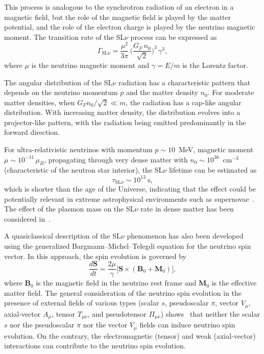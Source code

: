 \documentclass[a4paper,11pt]{article}
\begin{document}
This process is analogous to the synchrotron radiation of an electron in a magnetic field, but the role of the magnetic field is played by the matter potential, and the role of the electron charge is played by the neutrino magnetic moment. The transition rate of the SL$\nu$ process can be expressed as~\cite{Grigoriev:2005PLB}
\begin{equation}
\label{eq:SLnu_rate}
\Gamma_{\text{SL}\nu} = \frac{\mu^2}{3\pi}\,\Big(\frac{G_F\,n_0}{\sqrt{2}}\Big)^3\,\gamma^3,
\end{equation}
where $\mu$ is the neutrino magnetic moment and $\gamma = E/m$ is the Lorentz factor.

The angular distribution of the SL$\nu$ radiation has a characteristic pattern that depends on the neutrino momentum $p$ and the matter density $n_0$. For moderate matter densities, when $G_F n_0 / \sqrt{2} \ll m$, the radiation has a cap-like angular distribution. With increasing matter density, the distribution evolves into a projector-like pattern, with the radiation being emitted predominantly in the forward direction.

For ultra-relativistic neutrinos with momentum $p \sim 10$~MeV, magnetic moment $\mu \sim 10^{-11}\,\mu_B$, propagating through very dense matter with $n_0 \sim 10^{36}$~cm$^{-3}$ (characteristic of the neutron star interior), the SL$\nu$ lifetime can be estimated as
\begin{equation}
\tau_{\text{SL}\nu} \sim 10^{13}~\text{s},
\end{equation}
which is shorter than the age of the Universe, indicating that the effect could be potentially relevant in extreme astrophysical environments such as supernovae~\cite{Grigoriev:2017JCAP}. The effect of the plasmon mass on the SL$\nu$ rate in dense matter has been considered in~\cite{Grigoriev:2012PLB}.

A quasiclassical description of the SL$\nu$ phenomenon has also been developed~\cite{Lobanov:Studenikin:2003PLB} using the generalized Bargmann--Michel--Telegdi equation for the neutrino spin vector. In this approach, the spin evolution is governed by
\begin{equation}
\label{eq:BMT_full}
\frac{d\mathbf{S}}{dt} = \frac{2\mu}{\gamma}\Big[\mathbf{S} \times (\mathbf{B}_0 + \mathbf{M}_0)\Big],
\end{equation}
where $\mathbf{B}_0$ is the magnetic field in the neutrino rest frame and $\mathbf{M}_0$ is the effective matter field. The general consideration of the neutrino spin evolution in the presence of external fields of various types (scalar $s$, pseudoscalar $\pi$, vector $V_\mu$, axial-vector $A_\mu$, tensor $T_{\mu\nu}$, and pseudotensor $\Pi_{\mu\nu}$) shows~\cite{Dvornikov:Studenikin:2002JHEP} that neither the scalar $s$ nor the pseudoscalar $\pi$ nor the vector $V_\mu$ fields can induce neutrino spin evolution. On the contrary, the electromagnetic (tensor) and weak (axial-vector) interactions can contribute to the neutrino spin evolution.
\end{document}
